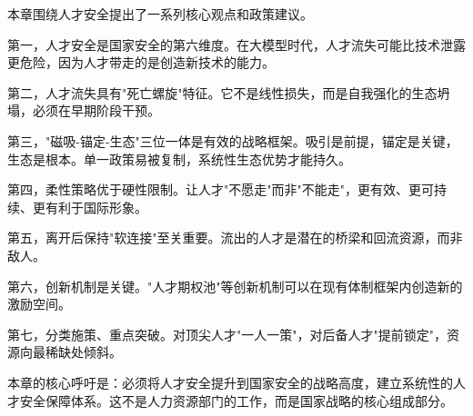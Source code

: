 本章围绕人才安全提出了一系列核心观点和政策建议。

第一，人才安全是国家安全的第六维度。在大模型时代，人才流失可能比技术泄露更危险，因为人才带走的是创造新技术的能力。

第二，人才流失具有"死亡螺旋"特征。它不是线性损失，而是自我强化的生态坍塌，必须在早期阶段干预。

第三，"磁吸-锚定-生态"三位一体是有效的战略框架。吸引是前提，锚定是关键，生态是根本。单一政策易被复制，系统性生态优势才能持久。

第四，柔性策略优于硬性限制。让人才"不愿走"而非"不能走"，更有效、更可持续、更有利于国际形象。

第五，离开后保持"软连接"至关重要。流出的人才是潜在的桥梁和回流资源，而非敌人。

第六，创新机制是关键。"人才期权池"等创新机制可以在现有体制框架内创造新的激励空间。

第七，分类施策、重点突破。对顶尖人才"一人一策"，对后备人才"提前锁定"，资源向最稀缺处倾斜。

本章的核心呼吁是：必须将人才安全提升到国家安全的战略高度，建立系统性的人才安全保障体系。这不是人力资源部门的工作，而是国家战略的核心组成部分。

